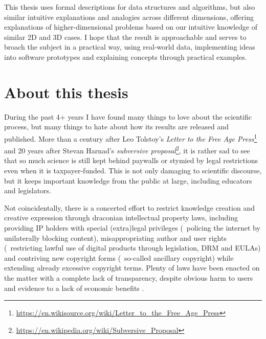 This thesis uses formal descriptions for data structures and algorithms, but also similar intuitive explanations and analogies across different dimensions, offering explanations of higher-dimensional problems based on our intuitive knowledge of similar 2D and 3D cases.
I hope that the result is approachable and serves to broach the subject in a practical way, using real-world data, implementing ideas into software prototypes and explaining concepts through practical examples.

\section*{About this thesis}

During the past 4+ years I have found many things to love about the scientific process, but many things to hate about how its results are released and published.
More than a century after Leo Tolstoy's \emph{Letter to the Free Age Press}\footnote{\url{https://en.wikisource.org/wiki/Letter_to_the_Free_Age_Press}} and 20 years after Stevan Harnad's \emph{subversive proposal}\footnote{\url{https://en.wikipedia.org/wiki/Subversive_Proposal}}, it is rather sad to see that so much science is still kept behind paywalls or stymied by legal restrictions even when it is taxpayer-funded.
This is not only damaging to scientific discourse, but it keeps important knowledge from the public at large, including educators and legislators.

Not coincidentally, there is a concerted effort to restrict knowledge creation and creative expression through draconian intellectual property laws, including providing IP holders with special (extra)legal privileges (\eg\ policing the internet by unilaterally blocking content), misappropriating author and user rights (\eg\ restricting lawful use of digital products through legislation, DRM and EULAs) and contriving new copyright forms (\eg\ so-called ancillary copyright) while extending already excessive copyright terms.
Plenty of laws have been enacted on the matter with a complete lack of transparency, despite obvious harm to users and evidence to a lack of economic benefits \citep{Hargreaves11,Reda14,EFI15}.

